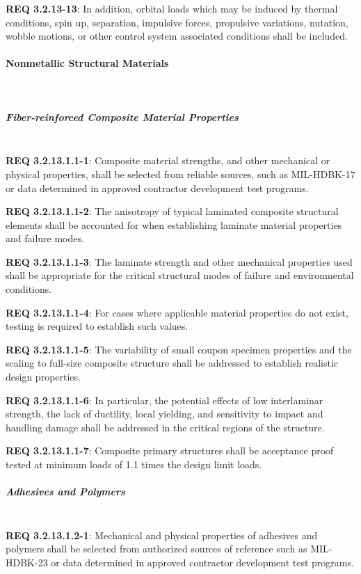 \documentclass[12pt]{article}
\begin{document}
\noindent \textbf{REQ 3.2.13-13}: In addition, orbital loads which may be induced by thermal conditions, spin up, separation, impulsive forces, propulsive variations, nutation, wobble motions, or other control system associated conditions shall be included.


\paragraph{Nonmetallic Structural Materials} \mbox{} \\ %
\subparagraph{Fiber-reinforced Composite Material Properties} \mbox{} \\ %
\noindent \textbf{REQ 3.2.13.1.1-1}: Composite material strengths, and other mechanical or physical properties, shall be selected from reliable sources, such as MIL-HDBK-17 or data determined in approved contractor development test programs.

\noindent \textbf{REQ 3.2.13.1.1-2}: The anisotropy of typical laminated composite structural elements shall be accounted for when establishing laminate material properties and failure modes. 

\noindent \textbf{REQ 3.2.13.1.1-3}: The laminate strength and other mechanical properties used shall be appropriate for the critical structural modes of failure and environmental conditions.

\noindent \textbf{REQ 3.2.13.1.1-4}: For cases where applicable material properties do not exist, testing is required to establish such values. 

\noindent \textbf{REQ 3.2.13.1.1-5}: The variability of small coupon specimen properties and the scaling to full-size composite structure shall be addressed to establish realistic design properties. 

\noindent \textbf{REQ 3.2.13.1.1-6}: In particular, the potential effects of low interlaminar strength, the lack of ductility, local yielding, and sensitivity to impact and handling damage shall be addressed in the critical regions of the structure. 

\noindent \textbf{REQ 3.2.13.1.1-7}: Composite primary structures shall be acceptance proof tested at minimum loads of 1.1 times the design limit loads.


\subparagraph{Adhesives and Polymers} \mbox{} \\ %
\noindent \textbf{REQ 3.2.13.1.2-1}: Mechanical and physical properties of adhesives and polymers shall be selected from authorized sources of reference such as MIL-HDBK-23 or data determined in approved contractor development test programs.
\end{document}

